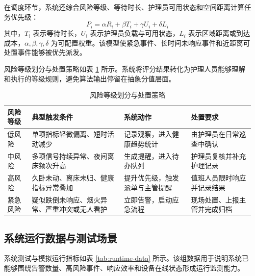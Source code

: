 \documentclass[UTF8,a4paper,zihao=-4,fontset=fandol]{ctexart}
\begin{document}
在调度环节，系统还综合风险等级、等待时长、护理员可用状态和空间距离计算任务优先级：
\begin{equation}
P_i=\alpha R_i+\beta T_i+\gamma U_i+\delta L_i
\label{eq:priority}
\end{equation}
其中，$T_i$ 表示等待时长，$U_i$ 表示护理员负载与可用状态，$L_i$ 表示区域距离或到达成本，$\alpha,\beta,\gamma,\delta$ 为可配置权重。该模型使紧急事件、长时间未响应事件和近距离可处置事件能够被优先派发。

风险等级划分与处置策略如表 \ref{tab:risk-levels} 所示。系统将评分结果转化为护理人员能够理解和执行的等级规则，避免算法输出停留在抽象分值层面。

\begin{table}[H]
  \centering
  \caption{风险等级划分与处置策略}
  \label{tab:risk-levels}
  \begin{tabularx}{\textwidth}{>{\centering\arraybackslash}p{2.4cm}>{\centering\arraybackslash}p{3.2cm}>{\centering\arraybackslash}X>{\centering\arraybackslash}p{3.2cm}}
    \toprule
    风险等级 & 典型触发条件 & 系统动作 & 处置要求 \\
    \midrule
    低风险 & 单项指标轻微偏离、短时活动减少 & 记录观察，进入健康趋势统计 & 由护理员在日常巡查中确认 \\
    中风险 & 多项信号持续异常、夜间离床频次升高 & 生成提醒，进入待办队列 & 护理员复核并补充护理记录 \\
    高风险 & 久卧未动、离床未归、健康指标异常叠加 & 提升优先级，触发派单与主管提醒 & 值班人员限时响应并记录结果 \\
    紧急风险 & 疑似跌倒未响应、烟火异常、严重冲突或无人看护 & 立即告警，启动应急流程 & 现场处置、上报主管并完成归档 \\
    \bottomrule
  \end{tabularx}
\end{table}

\subsection{系统运行数据与测试场景}

系统测试与模拟运行指标如表 \ref{tab:runtime-data} 所示。该组数据用于说明系统已能够围绕告警数量、高风险事件、响应效率和设备在线状态形成运行监测能力。
\end{document}
